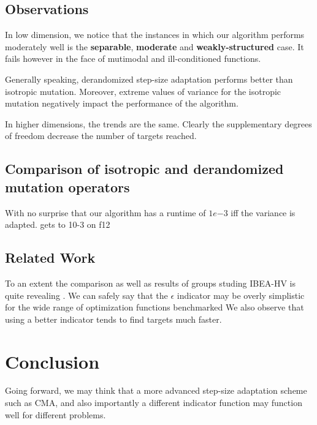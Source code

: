 \documentclass{sig-alternate}
\begin{document}
\subsection{Observations}

In low dimension, we notice that the instances in which our algorithm performs moderately well is the \textbf{separable}, \textbf{moderate} and \textbf{weakly-structured} case. It fails however in the face of mutimodal and ill-conditioned functions.

Generally speaking, derandomized step-size adaptation performs better than isotropic mutation. Moreover, extreme values of variance for the isotropic mutation negatively impact the performance of the algorithm.

In higher dimensions, the trends are the same. Clearly the supplementary degrees of freedom decrease the number of targets reached.

\subsection{Comparison of isotropic and derandomized mutation operators}

With no surprise that our algorithm has a runtime of $1e{-3}$ iff the variance is adapted. gets to 10-3 on f12

\subsection{Related Work}
To an extent the comparison  as well as results of groups studing IBEA-HV is quite revealing . 
We can safely say that the $\epsilon$ indicator may be overly simplistic for the wide range of optimization functions benchmarked
We also observe that using a better indicator tends to find targets much faster.

\section*{Conclusion}
Going forward, we may think that a more advanced step-size adaptation scheme such as CMA, and also importantly a different indicator function may function well for different problems.




\end{document}
